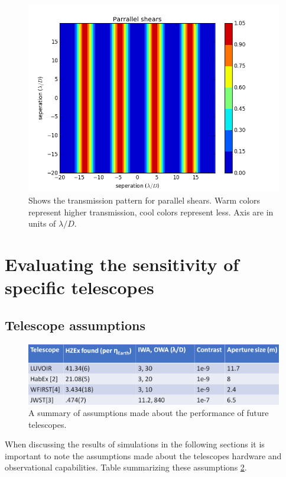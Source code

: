 \documentclass{article}
\begin{document}
	\begin{figure}
		\includegraphics[width = \linewidth]{T_xy2.png}
		\caption{ Shows the transmission pattern for parallel shears. Warm colors represent higher transmission, cool colors represent less. Axis are in units of $\lambda/D$.}
		\label{fig:T_xy2}
	\end{figure}
	
	\section{Evaluating the sensitivity of specific telescopes}
	
	\subsection{Telescope assumptions}
	
	\begin{figure}
	\includegraphics[width = \linewidth]{telescope_table.png}
	\caption{A summary of assumptions made about the performance of future telescopes.}
	\label{fig:telescope}
	\end{figure}
	
	When discussing the results of simulations in the following sections it is important to note the assumptions made about the telescopes hardware and observational capabilities. Table summarizing these assumptions \ref{fig:telescope}.
	
\end{document}
